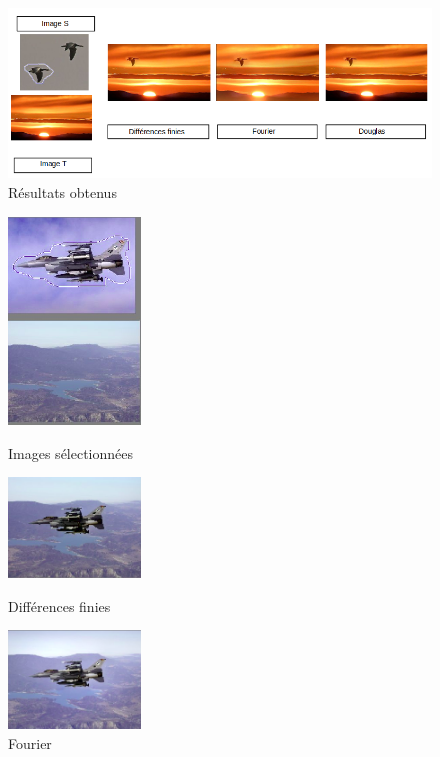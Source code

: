 \begin{figure}[!htb]
\centering
\includegraphics[scale=0.6]{Images/Resultats/7.png}
\caption{Résultats obtenus}
\end{figure}

\begin{figure}[!htb]
   \begin{minipage}{0.3\textwidth}
     \centering
     \includegraphics[width = 100pt]{Images/Resultats/avionlac.png}
     \caption{Images sélectionnées}
      \end{minipage}\hfill
   \begin{minipage}{0.3\textwidth}
     \centering
     \includegraphics[width = 100pt]{Images/Resultats/avion.png}
     \caption{Différences finies}
      \end{minipage}\hfill
   \begin{minipage}{0.3\textwidth}
     \centering
     \includegraphics[width= 100pt]{Images/Resultats/avionFourier.png}
     \caption{Fourier}
   \end{minipage}
\end{figure}
\newpage